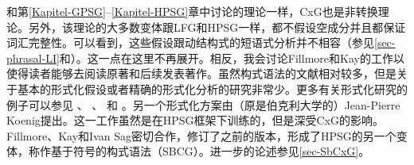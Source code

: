 和第\ref{Kapitel-GPSG}--\ref{Kapitel-HPSG}章中讨论的理论一样，CxG也是非转换理论。另外，该理论的大多数变体跟LFG和HPSG一样，都不假设空成分并且都保证词汇完整性。可以看到，这些假设跟动结构式的短语式分析并不相容（参见\ref{sec-phrasal-LI}和\citet{Mueller2006d,Mueller2007d}）。这一点在这里不再展开。相反，我会讨论Fillmore和Kay的工作以使得读者能够去阅读原著和后续发表著作。虽然构式语法的文献相对较多，但是关于基本的形式化假设或者精确的形式化分析的研究非常少。更多有关形式化研究的例子可以参见 、 \citet{Kay2002a}、 和 。另一个形式化方案由（原是伯克利大学的）Jean-Pierre Koenig\citeyearpar{Koenig99a}提出。这一工作虽然是在HPSG框架下训练的，但是深受CxG的影响。Fillmore、Kay和Ivan Sag密切合作，修订了之前的版本，形成了HPSG的另一个变体，称作基于符号的构式语法（SBCG）\citep{Sag2010b,Sag2012a}。进一步的论述参见\ref{sec-SbCxG}。

